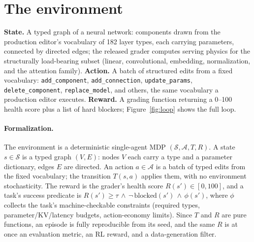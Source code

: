 \documentclass{article}
\begin{document}
\section{The environment}
\textbf{State.} A typed graph of a neural network: components drawn from the production editor's vocabulary of 182 layer types, each carrying parameters, connected by directed edges; the released grader computes serving physics for the structurally load-bearing subset (linear, convolutional, embedding, normalization, and the attention family). \textbf{Action.} A batch of structured edits from a fixed vocabulary: \texttt{add\_component}, \texttt{add\_connection}, \texttt{update\_params}, \texttt{delete\_component}, \texttt{replace\_model}, and others, the same vocabulary a production editor executes. \textbf{Reward.} A grading function returning a 0--100 health score plus a list of hard blockers; Figure~\ref{fig:loop} shows the full loop.

\paragraph{Formalization.} The environment is a deterministic single-agent MDP $(\mathcal{S},\mathcal{A},T,R)$. A state $s\in\mathcal{S}$ is a typed graph $(V,E)$: nodes $V$ each carry a type and a parameter dictionary, edges $E$ are directed. An action $a\in\mathcal{A}$ is a batch of typed edits from the fixed vocabulary; the transition $T(s,a)$ applies them, with no environment stochasticity. The reward is the grader's health score $R(s')\in[0,100]$, and a task's success predicate is $R(s')\ge\tau \,\wedge\, \neg\,\mathrm{blocked}(s') \,\wedge\, \phi(s')$, where $\phi$ collects the task's machine-checkable constraints (required types, parameter/KV/latency budgets, action-economy limits). Since $T$ and $R$ are pure functions, an episode is fully reproducible from its seed, and the same $R$ is at once an evaluation metric, an RL reward, and a data-generation filter.
\end{document}
